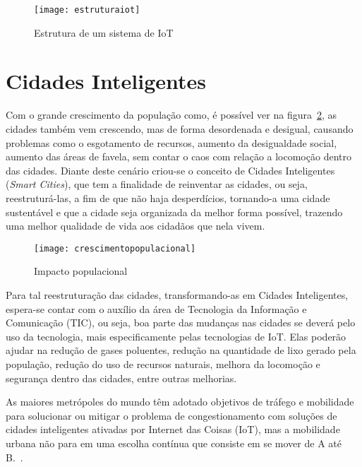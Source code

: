 \begin{figure}[htb]
\caption{\label{fig:estruturaiot} Estrutura de um sistema de IoT}
\begin{center}
\texttt{[image: estruturaiot]}
\end{center}
\end{figure}

\section{Cidades Inteligentes}
\label{sec:smartcities}
Com o grande crescimento da população como, é possível ver na figura~\ref{fig:crescimentopopulacional}, as cidades também vem crescendo, mas de forma desordenada e desigual, causando problemas como o esgotamento de recursos, aumento da desigualdade social, aumento das áreas de favela, sem contar o caos com relação a locomoção dentro das cidades. Diante deste cenário criou-se o conceito de Cidades Inteligentes (\textit{Smart Cities}), que tem a finalidade de reinventar as cidades, ou seja, reestruturá-las, a fim de que não haja desperdícios, tornando-a uma cidade sustentável e que a cidade seja organizada da melhor forma possível, trazendo uma melhor qualidade de vida aos cidadãos que nela vivem.\cite{leite2012cidades}

\begin{figure}[!h]
\caption{\label{fig:crescimentopopulacional} Impacto populacional}
\begin{center}
\texttt{[image: crescimentopopulacional]}
\end{center}
\end{figure}

Para tal reestruturação das cidades, transformando-as em Cidades Inteligentes, espera-se contar com o auxílio da área de Tecnologia da Informação e Comunicação (TIC), ou seja, boa parte das mudanças nas cidades se deverá pelo uso da tecnologia, mais especificamente pelas tecnologias de IoT. Elas poderão ajudar na redução de gases poluentes, redução na quantidade de lixo gerado pela população, redução do uso de recursos naturais, melhora da locomoção e segurança dentro das cidades, entre outras melhorias.\cite{leite2012cidades} 

\begin{citacao}
As maiores metrópoles do mundo têm adotado objetivos de tráfego e mobilidade para solucionar ou mitigar o problema de congestionamento com soluções de cidades inteligentes ativadas por Internet das Coisas (IoT), mas a mobilidade urbana não para em uma escolha contínua que consiste em se mover de A até B.~\cite[p. 1]{smartcities2017}.
\end{citacao}

